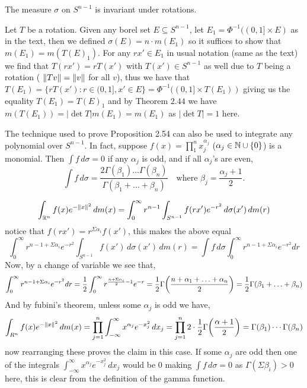 \documentclass[12pt,a4paper]{article}
\begin{document}
\begin{problem}\label{prob:2-62}
The measure $\sigma$ on $S^{n-1}$ is invariant under rotations.
\end{problem}
\begin{solution}
	Let $T$ be a rotation. 
	Given any borel set $E\subseteq S^{n-1}$, let $E_1=\Phi^{-1}((0,1]\times E)$ as in the text, then we defined $\sigma(E)=n\cdot m(E_1)$ so it suffices to show that $m(E_1)=m(T(E)_1)$. 
	For any $rx'\in E_1$ in usual notation (same as the text) we find that $T(rx')=rT(x')$ with $T(x')\in S^{n-1}$ as well due to $T$ being a rotation ( $\norm{Tv}=\norm{v}$ for all $v$), thus we have that $T(E_1)=\{rT(x'):r\in(0,1],x'\in E\}=\Phi^{-1}((0,1]\times T(E_1))$ giving us the equality $T(E_1)=T(E)_1$ and by Theorem $2.44$ we have $m(T(E_1))=|\det T|m(E_1)=m(E_1)$ as $|\det T|=1$ here.
\end{solution}
\begin{problem}\label{prob:2-63}
The technique used to prove Proposition 2.54 can also be used to integrate any polynomial over $S^{n-1}$. In fact, suppose $f(x) = \prod_1^n x_j^{\alpha_j}$ ($\alpha_j \in \mathbb{N} \cup \{0\}$) is a monomial. Then $\int f \, d\sigma = 0$ if any $\alpha_j$ is odd, and if all $\alpha_j$'s are even,
\[ \int f \, d\sigma = \frac{2\Gamma(\beta_1) \dots \Gamma(\beta_n)}{\Gamma(\beta_1 + \dots + \beta_n)} \quad \text{where } \beta_j = \frac{\alpha_j + 1}{2}. \]
\end{problem}
\begin{solution}
    \[
		\int_{\mathbb{R}^n}f(x)e^{-\norm{x}^2}\,dm(x)=\int_0^\infty r^{n-1}\int_{S^{n-1}}f(rx')e^{-r^2}\,d\sigma(x')\,dm(r)
    \]
	notice that $f(rx')=r^{\Sigma\alpha_i}f(x')$, this makes the above equal 
	\[
		\int_0^\infty r^{n-1+\Sigma\alpha_i}e^{-r^2}\int_{S^{n-1}} f(x')\,d\sigma(x')\,dm(r)=\int f\,d\sigma\int_0^\infty r^{n-1+\Sigma\alpha_i}e^{-r^2}dr
	\]
	Now, by a change of variable we see that,
	\[
		\int_0^\infty r^{n-1+\Sigma\alpha_i}e^{-r^2}dr= \frac{1}{2}\int_0^\infty r^{ \frac{n+\Sigma\alpha_i}{2}-1}e^{-r}= \frac{1}{2}\Gamma\qty( \frac{n+\alpha_1+\ldots+\alpha_n}{2})= \frac{1}{2}\Gamma(\beta_1+\ldots+\beta_n)
	\]
	And by fubini's theorem, unless some $\alpha_j$ is odd  we have,
	\[
	\int_{R^n}f(x)e^{-\norm{x}^2}\,dm(x)=\prod_{j=1}^n\int_{-\infty}^\infty x^{\alpha_j}e^{-x_j^2}\,dx_j=\prod_{j=1}^n2\cdot\frac{1}{2}\Gamma\qty(\frac{\alpha+1}{2})=\Gamma(\beta_1)\cdots\Gamma(\beta_n)
	\]
	now rearranging these proves the claim in this case. 
	If some $\alpha_j$ are odd then one of the integrals $\int_{-\infty}^\infty x^{\alpha_j}e^{-x_j^2}\,dx_j$ would be $0$ making $\int f\,d\sigma=0$ as $\Gamma(\Sigma\beta_i)>0$ here, this is clear from the definition of the gamma function.
\end{solution}
\end{document}
